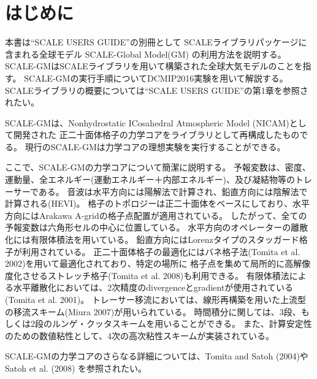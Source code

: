 \section{はじめに}

本書は``SCALE USERS GUIDE''の別冊として
SCALEライブラリパッケージに含まれる全球モデル SCALE-Global Model(GM) の利用方法を説明する。
SCALE-GMはSCALEライブラリを用いて構築された全球大気モデルのことを指す。
SCALE-GMの実行手順についてDCMIP2016実験を用いて解説する。
SCALEライブラリの概要については``SCALE USERS GUIDE''の第1章を参照されたい。


SCALE-GMは、Nonhydrostatic ICosahedral Atmospheric Model (NICAM)として開発された
正二十面体格子の力学コアをライブラリとして再構成したものでる。
現行のSCALE-GMは力学コアの理想実験を実行することができる。



ここで、SCALE-GMの力学コアについて簡潔に説明する。
予報変数は、密度、運動量、全エネルギー(運動エネルギー＋内部エネルギー)、及び凝結物等のトレーサーである。
音波は水平方向には陽解法で計算され、鉛直方向には陰解法で計算される(HEVI)。
格子のトポロジーは正二十面体をベースにしており、水平方向にはArakawa A-gridの格子点配置が適用されている。
したがって、全ての予報変数は六角形セルの中心に位置している。
水平方向のオペレーターの離散化には有限体積法を用いている。
鉛直方向にはLorenzタイプのスタッガード格子が利用されている。
正二十面体格子の最適化にはバネ格子法(Tomita et al. 2002)を用いて最適化されており、特定の場所に
格子点を集めて局所的に高解像度化させるストレッチ格子(Tomita et al. 2008)も利用できる。
有限体積法による水平離散化においては、2次精度のdivergenceとgradientが使用されている(Tomita et al. 2001)。
トレーサー移流においては、線形再構築を用いた上流型の移流スキーム(Miura 2007)が用いられている。
時間積分に関しては、3段、もしくは2段のルンゲ・クッタスキームを用いることができる。
また、計算安定性のための数値粘性として、4次の高次粘性スキームが実装されている。

SCALE-GMの力学コアのさらなる詳細については、Tomita and Satoh (2004)やSatoh et al. (2008)
を参照されたい。


